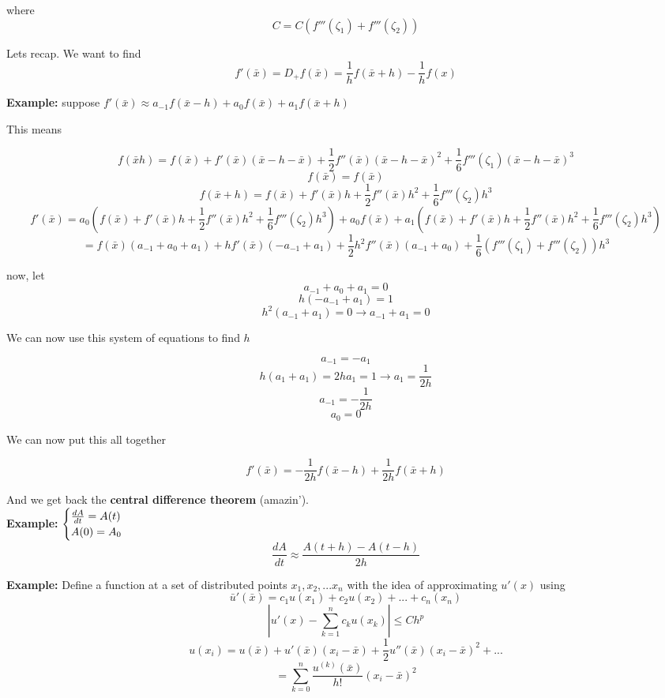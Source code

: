\documentclass[10pt, AMS Euler]{article}
\begin{document}
where
\[C = C(f'''(\zeta_1) + f'''(\zeta_2))\]


Lets recap. We want to find 
\[f'(\bar{x}) = D_+ f(\bar{x}) = \frac{1}{h}f(\bar{x} + h) - \frac{1}{h} f(x)\]


\textbf{Example:} suppose $f'(\bar{x}) \approx a_{-1} f(\bar{x} - h) + a_0 f(\bar{x}) + a_1 f(\bar{x} + h)$

This means

\[f(\bar{x} h) = f(\bar{x}) + f'(\bar{x})(\bar{x} - h - \bar{x}) + \frac{1}{2}f''(\bar{x}) (\bar{x} -h - \bar{x})^2 + \frac{1}{6} f'''(\zeta_1)(\bar{x} - h - \bar{x})^3\]
\[f(\bar{x}) = f(\bar{x})\]
\[f(\bar{x} + h) = f(\bar{x}) + f'(\bar{x})h + \frac{1}{2}f''(\bar{x})h^2 + \frac{1}{6}f'''(\zeta_2) h^3\]
\[f'(\bar{x}) = a_0(f(\bar{x}) + f'(\bar{x})h + \frac{1}{2}f''(\bar{x})h^2 + \frac{1}{6}f'''(\zeta_2) h^3) + a_0 f(\bar{x}) + a_1(f(\bar{x}) + f'(\bar{x})h + \frac{1}{2}f''(\bar{x})h^2 + \frac{1}{6}f'''(\zeta_2) h^3)\]
\[= f(\bar{x})(a_{-1} + a_0 + a_1) + h f'(\bar{x}) (-a_{-1} + a_1) + \frac{1}{2}h^2f''(\bar{x}) (a_{-1} + a_0) + \frac{1}{6} (f'''(\zeta_1) + f'''(\zeta_2))h^3\]

now, let
\[a_{-1} + a_0 + a_1 = 0\]
\[h(-a_{-1} + a_1) = 1\]
\[h^2(a_{-1} + a_1) = 0 \rightarrow a_{-1} + a_1 = 0\]

We can now use this system of equations to find $h$

\[a_{-1} = - a_1\]
\[h(a_1 + a_1) = 2h a_1 = 1 \rightarrow a_1 = \frac{1}{2h}\]
\[a_{-1} = -\frac{1}{2h}\]
\[a_0 = 0\]

We can now put this all together

\[f'(\bar{x}) = -\frac{1}{2h} f(\bar{x} - h) + \frac{1}{2h}f(\bar{x} + h)\]

And we get back the \textbf{central difference theorem} (amazin').\\

\textbf{Example:} 
$
\begin{cases}
    \frac{dA}{dt} = A(t)\\
    A(0) = A_0\\
\end{cases}\\
$
\[\frac{dA}{dt} \approx \frac{A(t + h) - A(t - h)}{2h}\]


\textbf{Example:} Define a function at a set of distributed points $x_1, x_2, ... x_n$ with the idea of approximating $u'(x)$ using
\[\bar{u}'(\bar{x}) = c_1 u(x_1) + c_2u(x_2) + ... + c_n(x_n)\]
\[|u'(x) - \sum_{k=1}^n c_k u(x_k)| \leq Ch^p\]
\[u(x_i) = u(\bar{x}) + u'(\bar{x}) (x_i - \bar{x}) + \frac{1}{2} u''(\bar{x})(x_i - \bar{x})^2 + ...\]
\[= \sum_{k=0}^n \frac{u^{(k)}(\bar{x})}{h!} (x_i - \bar{x})^2\]
\end{document}
